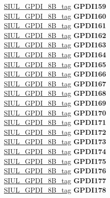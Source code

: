 \begin{DoxyCompactItemize}
\begin{tabbing}
\>\>\mbox{\hyperlink{unionSIUL__GPDI__8B__tag}{SIUL\_GPDI\_8B\_tag}} {\bfseries GPDI159}\\
\>\>\mbox{\hyperlink{unionSIUL__GPDI__8B__tag}{SIUL\_GPDI\_8B\_tag}} {\bfseries GPDI160}\\
\>\>\mbox{\hyperlink{unionSIUL__GPDI__8B__tag}{SIUL\_GPDI\_8B\_tag}} {\bfseries GPDI161}\\
\>\>\mbox{\hyperlink{unionSIUL__GPDI__8B__tag}{SIUL\_GPDI\_8B\_tag}} {\bfseries GPDI162}\\
\>\>\mbox{\hyperlink{unionSIUL__GPDI__8B__tag}{SIUL\_GPDI\_8B\_tag}} {\bfseries GPDI163}\\
\>\>\mbox{\hyperlink{unionSIUL__GPDI__8B__tag}{SIUL\_GPDI\_8B\_tag}} {\bfseries GPDI164}\\
\>\>\mbox{\hyperlink{unionSIUL__GPDI__8B__tag}{SIUL\_GPDI\_8B\_tag}} {\bfseries GPDI165}\\
\>\>\mbox{\hyperlink{unionSIUL__GPDI__8B__tag}{SIUL\_GPDI\_8B\_tag}} {\bfseries GPDI166}\\
\>\>\mbox{\hyperlink{unionSIUL__GPDI__8B__tag}{SIUL\_GPDI\_8B\_tag}} {\bfseries GPDI167}\\
\>\>\mbox{\hyperlink{unionSIUL__GPDI__8B__tag}{SIUL\_GPDI\_8B\_tag}} {\bfseries GPDI168}\\
\>\>\mbox{\hyperlink{unionSIUL__GPDI__8B__tag}{SIUL\_GPDI\_8B\_tag}} {\bfseries GPDI169}\\
\>\>\mbox{\hyperlink{unionSIUL__GPDI__8B__tag}{SIUL\_GPDI\_8B\_tag}} {\bfseries GPDI170}\\
\>\>\mbox{\hyperlink{unionSIUL__GPDI__8B__tag}{SIUL\_GPDI\_8B\_tag}} {\bfseries GPDI171}\\
\>\>\mbox{\hyperlink{unionSIUL__GPDI__8B__tag}{SIUL\_GPDI\_8B\_tag}} {\bfseries GPDI172}\\
\>\>\mbox{\hyperlink{unionSIUL__GPDI__8B__tag}{SIUL\_GPDI\_8B\_tag}} {\bfseries GPDI173}\\
\>\>\mbox{\hyperlink{unionSIUL__GPDI__8B__tag}{SIUL\_GPDI\_8B\_tag}} {\bfseries GPDI174}\\
\>\>\mbox{\hyperlink{unionSIUL__GPDI__8B__tag}{SIUL\_GPDI\_8B\_tag}} {\bfseries GPDI175}\\
\>\>\mbox{\hyperlink{unionSIUL__GPDI__8B__tag}{SIUL\_GPDI\_8B\_tag}} {\bfseries GPDI176}\\
\>\>\mbox{\hyperlink{unionSIUL__GPDI__8B__tag}{SIUL\_GPDI\_8B\_tag}} {\bfseries GPDI177}\\
\>\>\mbox{\hyperlink{unionSIUL__GPDI__8B__tag}{SIUL\_GPDI\_8B\_tag}} {\bfseries GPDI178}\\

\end{tabbing}
\end{DoxyCompactItemize}
